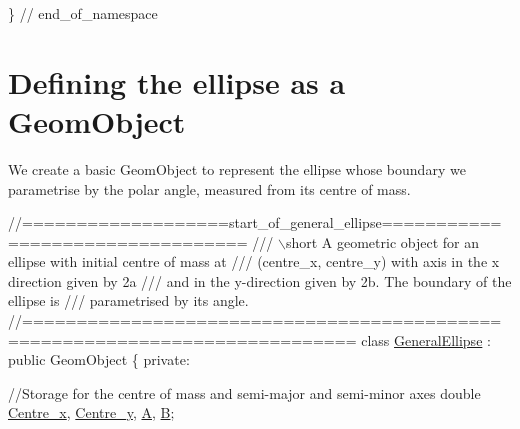 \begin{DoxyCodeInclude}
 \} \textcolor{comment}{// end\_of\_namespace}

\end{DoxyCodeInclude}




 

\hypertarget{index_ellipse}{}\section{Defining the ellipse as a Geom\+Object}\label{index_ellipse}
We create a basic {\ttfamily Geom\+Object} to represent the ellipse whose boundary we parametrise by the polar angle, measured from its centre of mass.

 
\begin{DoxyCodeInclude}
\textcolor{comment}{//===================start\_of\_general\_ellipse=================================}
\textcolor{comment}{/// \(\backslash\)short A geometric object for an ellipse with initial centre of mass at}
\textcolor{comment}{}\textcolor{comment}{/// (centre\_x, centre\_y) with axis in the x direction given by 2a}
\textcolor{comment}{}\textcolor{comment}{/// and in the y-direction given by 2b. The boundary of the ellipse is}
\textcolor{comment}{}\textcolor{comment}{/// parametrised by its angle.}
\textcolor{comment}{}\textcolor{comment}{//============================================================================}
\textcolor{keyword}{class }\hyperlink{classGeneralEllipse}{GeneralEllipse} : \textcolor{keyword}{public} GeomObject
\{
\textcolor{keyword}{private}:
 
 \textcolor{comment}{//Storage for the centre of mass and semi-major and semi-minor axes}
 \textcolor{keywordtype}{double} \hyperlink{classGeneralEllipse_aeb974769f58d136a12ac1532506304cc}{Centre\_x}, \hyperlink{classGeneralEllipse_abf2def5a5140bb35e381b800c4b91dc9}{Centre\_y}, \hyperlink{classGeneralEllipse_ae583e1437da6ad4eb228dda60b61808a}{A}, \hyperlink{classGeneralEllipse_a185ae9786d5c6c82eef61e163e9310c6}{B};


\end{DoxyCodeInclude}
